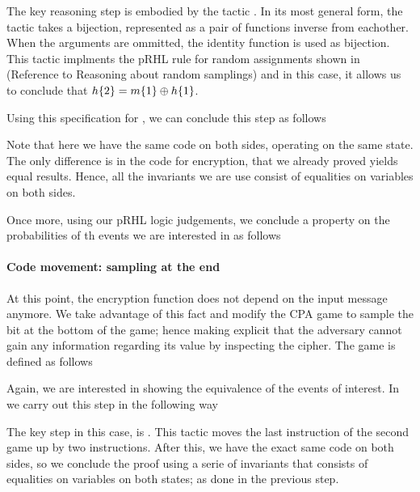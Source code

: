 The key reasoning step is embodied by the tactic . In its most general form, the 
tactic takes a bijection, represented as a pair of functions inverse
from eachother. When the arguments are ommitted, the identity function
is used as bijection. This tactic implments the pRHL rule for random
assignments shown in (Reference to Reasoning about random samplings)
and in this case, it allows us to conclude that ${h\{2\} = m\{1\} \oplus
  h\{1\}}$.

Using this specification for , we can conclude this step as
follows

Note that here we have the same code on both sides, operating on the
same state. The only difference is in the code for encryption, that we
already proved yields equal results. Hence, all the invariants we are
use consist of equalities on variables on both sides. 

Once more, using our pRHL logic judgements, we conclude a property on
the probabilities of th events we are interested in as follows






\paragraph{Code movement: sampling  at the end}
At this point, the encryption function does not depend on the input
message anymore. We take advantage of this fact and modify the CPA
game to sample the bit  at the bottom of the game; hence making
explicit that the adversary cannot gain any information regarding its
value by inspecting the cipher. The  game is defined as
follows

Again, we are interested in showing the equivalence of the events of
interest. In \EasyCrypt we carry out this step in the following way

The key step in this case, is . This tactic moves the
last instruction of the second game  %
up by two instructions. After this, we have the exact same code on
both sides, so we conclude the proof using a serie of invariants that
consists of equalities on variables on both states; as done in the
previous step. 

